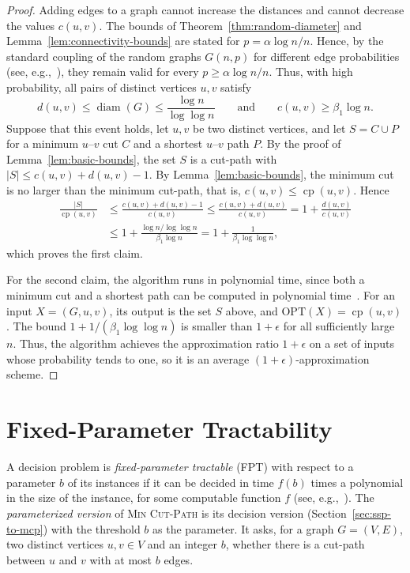 \documentclass[a4paper,fleqn]{cas-sc}
\numberwithin{equation}{section}
\theoremstyle{definition}
\theoremstyle{plain}
\theoremstyle{remark}
\newcommand{\cp}{\operatorname{cp}}                  %
\newcommand{\diam}{\operatorname{diam}}
\newcommand{\OPT}{\mathrm{OPT}}
\newcommand{\MinCutPath}{\textsc{Min Cut-Path}}
\begin{document}
\begin{proof}
Adding edges to a graph cannot increase the distances and cannot decrease the values $c(u,v)$.
The bounds of Theorem~\ref{thm:random-diameter} and Lemma~\ref{lem:connectivity-bounds} are stated for $p = \alpha \log n / n$.
Hence, by the standard coupling of the random graphs $G(n,p)$ for different edge probabilities (see, e.g.,~\cite[Section~1.1]{Frieze2016}), they remain valid for every $p \geq \alpha \log n / n$.
Thus, with high probability, all pairs of distinct vertices $u,v$ satisfy
\[
d(u,v) \leq \diam(G) \leq \frac{\log n}{\log \log n}
\qquad\text{and}\qquad
c(u,v) \geq \beta_1 \log n.
\]
Suppose that this event holds, let $u, v$ be two distinct vertices, and let $S = C \cup P$ for a minimum $u$--$v$ cut $C$ and a shortest $u$--$v$ path $P$.
By the proof of Lemma~\ref{lem:basic-bounds}, the set $S$ is a cut-path with $|S| \leq c(u,v) + d(u,v) - 1$.
By Lemma~\ref{lem:basic-bounds}, the minimum cut is no larger than the minimum cut-path, that is, $c(u,v) \leq \cp(u,v)$.
Hence
\begin{align*}
\frac{|S|}{\cp(u,v)} &\leq \frac{c(u,v)+d(u,v)-1}{c(u,v)} \leq \frac{c(u,v)+d(u,v)}{c(u,v)} = 1 + \frac{d(u,v)}{c(u,v)}\\
&\leq 1+\frac{\log n / \log \log n}{\beta_1 \log n} = 1 + \frac{1}{\beta_1 \log \log n},
\end{align*}
which proves the first claim.

For the second claim, the algorithm runs in polynomial time, since both a minimum cut and a shortest path can be computed in polynomial time~\cite{Cormen2022}.
For an input $X = (G, u, v)$, its output is the set $S$ above, and $\OPT(X) = \cp(u,v)$.
The bound $1 + 1/(\beta_1 \log \log n)$ is smaller than $1+\epsilon$ for all sufficiently large $n$.
Thus, the algorithm achieves the approximation ratio $1+\epsilon$ on a set of inputs whose probability tends to one, so it is an average $(1+\epsilon)$-approximation scheme.
\end{proof}

\section{Fixed-Parameter Tractability}
\label{sec:fpt}

A decision problem is \emph{fixed-parameter tractable} (FPT) with respect to a parameter $b$ of its instances if it can be decided in time $f(b)$ times a polynomial in the size of the instance, for some computable function $f$ (see, e.g.,~\cite{Marx2013Separators}).
The \emph{parameterized version} of \MinCutPath{} is its decision version (Section~\ref{sec:ssp-to-mcp}) with the threshold $b$ as the parameter.
It asks, for a graph $G = (V, E)$, two distinct vertices $u, v \in V$ and an integer $b$, whether there is a cut-path between $u$ and $v$ with at most $b$ edges.
\end{document}
